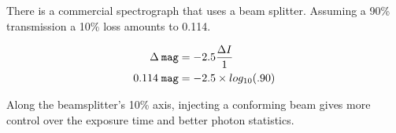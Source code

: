 \documentclass[letter,11pt,oneside]{article}
\begin{document}
There is a commercial spectrograph that uses a beam splitter. Assuming
a 90\% transmission a 10\% loss amounts to 0.114.


\begin{align}
\Delta\:{\tt{mag}} &= -2.5 \frac{\Delta{I}}{1} \\
    0.114\; \tt{mag} &= -2.5 \times log_{10}(.90)
\end{align}

Along the beamsplitter's 10\% axis, injecting a conforming beam gives more
control over the exposure time and better photon statistics. 





{}
\renewcommand*{\refname}{References}
{}	%






\end{document}
